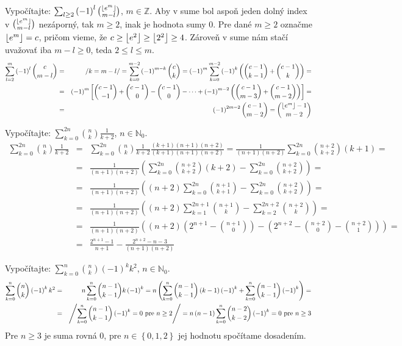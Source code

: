 \pr Vypočítajte: $\sum_{l\geq 2}\left(-1\right)^l{\left\lfloor e^m \right\rfloor \choose m-l}$, $m\in\mathbb{Z}$.
 Aby v sume bol aspoň jeden dolný index v ${\left\lfloor e^m \right\rfloor \choose m-l}$ nezáporný, tak $m\geq2$, inak je hodnota sumy $0$. Pre dané $m\geq2$ označme $\left\lfloor e^m \right\rfloor = c$, pričom vieme, že $c\geq\left\lfloor e^2 \right\rfloor\geq\left\lfloor 2^2 \right\rfloor\geq4$. Zároveň v sume nám stačí uvažovať iba $m-l\geq 0$, teda $2\leq l \leq m$.
\begin{eqnarray*}
\sum_{l=2}^m\left(-1\right)^l{c \choose m-l} &=& \left/ k=m - l\right/ = \sum_{k=0}^{m-2}\left(-1\right)^{m-k}{c \choose k} = \left(-1\right)^m\sum_{k=0}^{m-2}\left(-1\right)^k\left({c-1 \choose k-1} + {c-1 \choose k}\right) =\\
&=& \left(-1\right)^m\left\lbrack{c-1 \choose -1} + {c-1 \choose 0} - {c-1 \choose 0} - \cdots + \left(-1\right)^{m-2}\left({c-1 \choose m-3} + {c-1 \choose m-2}\right) \right\rbrack = \\
&=& \left(-1\right)^{2m-2}{c-1 \choose m-2} = {\left\lfloor e^m \right\rfloor-1 \choose m-2}
\end{eqnarray*}

\pr Vypočítajte: $\sum_{k=0}^{2n}{n \choose k}\frac1{k+2}$, $n\in\mathbb{N}_0$.
\begin{eqnarray*}
\sum_{k=0}^{2n}{n \choose k}\frac1{k+2} &=& \sum_{k=0}^{2n}{n \choose k}\frac1{k+2} \frac{\left(k+1\right)\left(n+1\right)\left(n+2\right)}{\left(k+1\right)\left(n+1\right)\left(n+2\right)} = \frac1{\left(n+1\right)\left(n+2\right)}\sum_{k=0}^{2n}{n+2 \choose k+2}\left(k+1\right) = \\
&=& \frac1{\left(n+1\right)\left(n+2\right)}\left(\sum_{k=0}^{2n}{n+2 \choose k+2}\left(k+2\right) - \sum_{k=0}^{2n}{n+2 \choose k+2}\right) = \\
&=& \frac1{\left(n+1\right)\left(n+2\right)}\left(\left(n+2\right)\sum_{k=0}^{2n}{n+1 \choose k+1}- \sum_{k=0}^{2n}{n+2 \choose k+2}\right) = \\
&=& \frac1{\left(n+1\right)\left(n+2\right)}\left(\left(n+2\right)\sum_{k=1}^{2n+1}{n+1 \choose k} - \sum_{k=2}^{2n+2}{n+2 \choose k}\right) =\\
&=& \frac1{\left(n+1\right)\left(n+2\right)}\left(\left(n+2\right)\left(2^{n+1}-{n+1 \choose 0}\right) - \left(2^{n+2} - {n+2 \choose 0} - {n+2 \choose 1}\right)\right) =\\
&=& \frac{2^{n+1}-1}{n+1} - \frac{2^{n+2} - n - 3}{\left(n+1\right)\left(n+2\right)}
\end{eqnarray*}

\pr Vypočítajte: $\sum_{k=0}^{n}{n \choose k}\left(-1\right)^k k^2$, $n\in\mathbb{N}_0$.
\begin{eqnarray*}
\sum_{k=0}^{n}{n \choose k}\left(-1\right)^k k^2 &=& n\sum_{k=0}^n {n-1 \choose k-1} k \left(-1\right)^k = n\left(\sum_{k=0}^n {n-1 \choose k-1} \left(k-1\right) \left(-1\right)^k + \sum_{k=0}^n {n-1 \choose k-1} \left(-1\right)^k \right) = \\
&=& \left/ \sum_{k=0}^n {n-1 \choose k-1} \left(-1\right)^k = 0 \hbox{ pre } n\geq2\right/ = n\left(n-1\right)\sum_{k=0}^n{n-2 \choose k-2}\left(-1\right)^k = 0 \hbox{ pre } n\geq3
\end{eqnarray*}
Pre $n\geq3$ je suma rovná $0$, pre $n\in\left\{0,1,2\right\}$ jej hodnotu spočítame dosadením.

